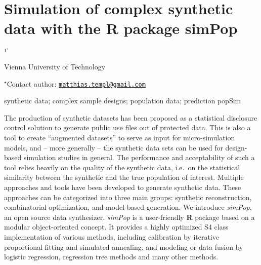 \documentclass[\main/boa.tex]{subfiles}
\begin{document}
\section{Simulation of complex synthetic data with the R package simPop}

\begin{center}
  {\bf {}$^{1^\star}$}
\end{center}

\vskip 0.3cm

\begin{affiliations}
\begin{enumerate}
\begin{minipage}{0.915\textwidth}
\centering
\item Vienna University of Technology \\[-2pt]
\end{minipage}
\end{enumerate}
$^\star$Contact author: \href{mailto:matthias.templ@gmail.com}{\nolinkurl{matthias.templ@gmail.com}}\\
\end{affiliations}

\vskip 0.5cm

\begin{minipage}{0.915\textwidth}
\keywords synthetic data; complex sample designs; population data; prediction
\packages popSim
\end{minipage}

\vskip 0.8cm

The production of synthetic datasets has been proposed as a statistical
disclosure control solution to generate public use files out of
protected data. This is also a tool to create ``augmented datasets'' to
serve as input for micro-simulation models, and -- more generally -- the
synthetic data sets can be used for design-based simulation studies in
general. The performance and acceptability of such a tool relies heavily
on the quality of the synthetic data, i.e.~on the statistical similarity
between the synthetic and the true population of interest. Multiple
approaches and tools have been developed to generate synthetic data.
These approaches can be categorized into three main groups: synthetic
reconstruction, combinatorial optimization, and model-based generation.
We introduce \emph{simPop}, an open source data synthesizer.
\emph{simPop} is a user-friendly \textbf{R} package based on a modular
object-oriented concept. It provides a highly optimized S4 class
implementation of various methods, including calibration by iterative
proportional fitting and simulated annealing, and modeling or data
fusion by logistic regression, regression tree methods and many other
methods.
\end{document}
